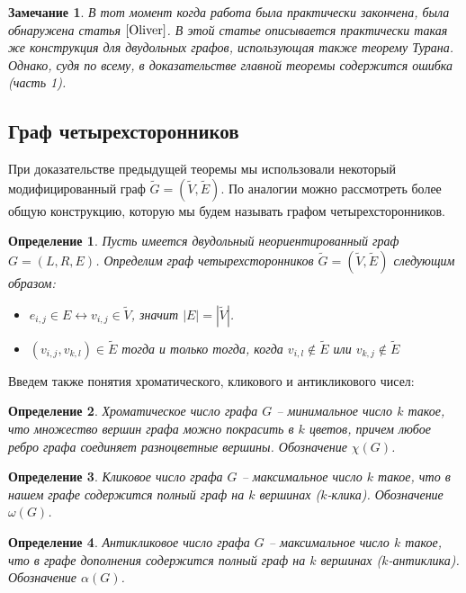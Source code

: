 \documentclass[a4paper]{article}
\newtheorem*{mremark}{Замечание}
\newtheorem*{mdefinition}{Определение}
\begin{document}
\begin{mremark}
    В тот момент когда работа была практически закончена, была обнаружена статья $\cite{Oliver}$. В этой статье 
    описывается практически такая же конструкция для двудольных графов, использующая также теорему Турана. 
    Однако, судя по всему, в доказательстве главной теоремы содержится ошибка (часть 1).
\end{mremark}


\subsection{Граф четырехсторонников}
При доказательстве предыдущей теоремы мы использовали некоторый модифицированный граф $\widetilde{G} = 
(\widetilde{V}, \widetilde{E})$. По аналогии можно рассмотреть более общую конструкцию, которую мы 
будем называть графом четырехсторонников. 
\begin{mdefinition}
    Пусть имеется двудольный неориентированный граф $G = (L, R, E)$. Определим граф четырехсторонников 
    $\widetilde{G} = (\widetilde{V}, \widetilde{E})$ следующим образом:
    \begin{itemize}[noitemsep]
        \item $e_{i,j}\in E \leftrightarrow v_{i,j}\in \widetilde{V}$, значит $|E| = |\widetilde{V}|$.
        \item $(v_{i,j}, v_{k, l}) \in \widetilde{E}$ тогда и только тогда, когда $v_{i,l}\notin \widetilde{E}$ 
        или $v_{k,j}\notin\widetilde{E}$
    \end{itemize}
\end{mdefinition}

Введем также понятия хроматического, кликового и антикликового чисел:
\begin{mdefinition}

    Хроматическое число графа $G$ -- минимальное число $k$ такое, что множество вершин графа можно 
    покрасить в $k$ цветов, причем любое ребро графа соединяет разноцветные вершины. Обозначение $\chi(G)$.
\end{mdefinition}
\begin{mdefinition} 
    Кликовое число графа $G$ -- максимальное число $k$ такое, что в нашем графе содержится полный 
    граф на $k$ вершинах ($k$-клика). Обозначение $\omega(G)$.
\end{mdefinition}
\begin{mdefinition} 
    Антикликовое число графа $G$ -- максимальное число $k$ такое, что в графе дополнения содержится 
    полный граф на $k$ вершинах ($k$-антиклика). Обозначение $\alpha(G)$.
\end{mdefinition}
\end{document}
